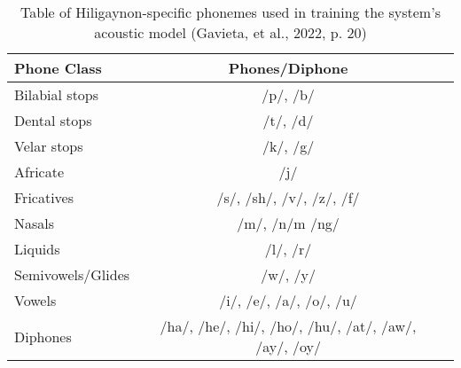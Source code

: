\begin{table}[htb]   %
	\setlength{\extrarowheight}{0.1em}
	\centering
	\caption{Table of Hiligaynon-specific phonemes used in training the system's acoustic model (Gavieta, et al., 2022, p. 20)} 
	\begin{tabular}{|p{2in}|c|c|} \hline
		\centering Phone Class & Phones/Diphone \\ \hline
		Bilabial stops & /p/, /b/ \\ \hline
		Dental stops & /t/, /d/ \\ \hline
		Velar stops & /k/, /g/  \\ \hline
		Africate & /j/ \\ \hline
		Fricatives & /s/, /sh/, /v/, /z/, /f/  \\ \hline
		Nasals & /m/, /n/m /ng/  \\ \hline
		Liquids & /l/, /r/ \\ \hline
		Semivowels/Glides & /w/, /y/  \\ \hline
		Vowels & /i/, /e/, /a/, /o/, /u/ \\ \hline
		Diphones & /ha/, /he/, /hi/, /ho/, /hu/, /at/, /aw/, /ay/, /oy/ \\ \hline
	\end{tabular}
	\label{tab:phoneme-hiligaynon}
\end{table}
















